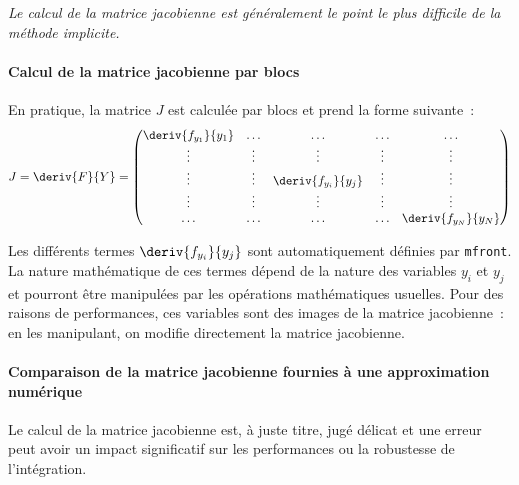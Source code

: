 \documentclass[rectoverso,pleiades,pstricks,leqno,anti]{texmf/note_technique_2010}
\newcommand{\mfront}{\texttt{mfront}}
\begin{document}
{\em Le calcul de la matrice jacobienne est généralement le point le
  plus difficile de la méthode implicite.}

\paragraph{Calcul de la matrice jacobienne par blocs} En pratique, la
matrice \(J\) est calculée par blocs et prend la forme suivante~:
\[
J = \deriv{F}{Y} =
\begin{pmatrix}
  \deriv{f_{y_{1}}}{y_{1}} & \ldots & \ldots & \ldots & \ldots \\
  \vdots & \vdots & \vdots & \vdots & \vdots \\
  \vdots & \vdots & \deriv{f_{y_{i}}}{y_{j}} & \vdots & \vdots \\
  \vdots & \vdots & \vdots & \vdots & \vdots \\
  \ldots & \ldots & \ldots & \ldots & \deriv{f_{y_{N}}}{y_{N}} \\
\end{pmatrix}
\]

Les différents termes \(\deriv{f_{y_{i}}}{y_{j}}\) sont automatiquement
définies par \mfront{}. La nature mathématique de ces termes dépend de
la nature des variables \(y_{i}\) et \(y_{j}\) et pourront être
manipulées par les opérations mathématiques usuelles. Pour des raisons
de performances, ces variables sont des images de la matrice
jacobienne~: en les manipulant, on modifie directement la matrice
jacobienne.

\paragraph{Comparaison de la matrice jacobienne fournies à une
  approximation numérique} Le calcul de la matrice jacobienne est, à
juste titre, jugé délicat et une erreur peut avoir un impact
significatif sur les performances ou la robustesse de l'intégration.
\end{document}
